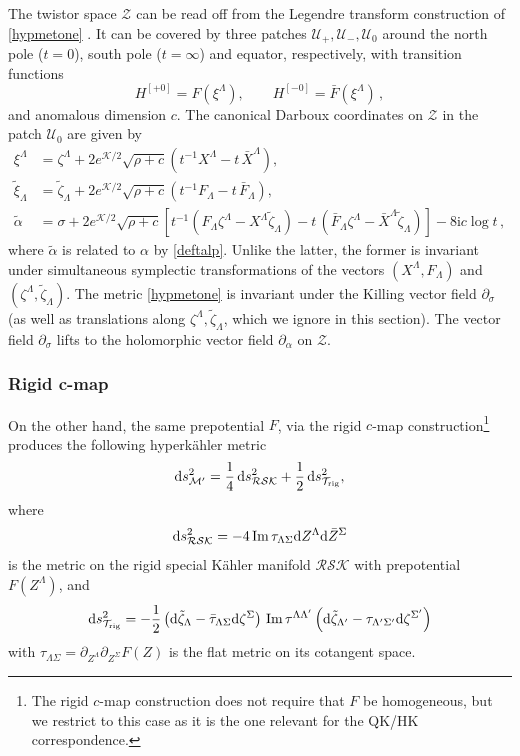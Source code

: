 \documentclass[12pt,reqno]{article}
\numberwithin{equation}{section}
\renewcommand{\Im}{\imag}
\DeclareMathOperator{\imag}{Im}
\newcommand{\be}{\begin{equation}}
\newcommand{\ee}{\end{equation}}
\def\Im{\,{\rm Im}\, }
\def\bX{\bar X}
\def\bZ{\bar Z}
\def\bF{\bar F}
\newcommand{\de}{\mathrm{d}}
\newcommand{\I}{\mathrm{i}}
\newcommand{\cS}{\mathcal{S}}
\newcommand{\cK}{\mathcal{K}}
\newcommand{\cM}{\mathcal{M}}
\newcommand{\cR}{\mathcal{R}}
\newcommand{\cT}{\mathcal{T}}
\newcommand{\cU}{\mathcal{U}}
\newcommand{\cZ}{\mathcal{Z}}
\def\Hij#1{H^{[#1]}}
\def\talp{\tilde\alpha}
\def\pa{\partial}
\newcommand{\tzeta}{{\tilde\zeta}}
\newcommand{\txi}{\tilde\xi}
\newcommand{\kahler}{{K\"ahler}\xspace}
\newcommand{\hk}{{hyperk\"ahler}\xspace}
\def\varpiqk{t}
\def\pcM{\cM'}
\def\rigZ{Z}
\def\brigZ{\bZ}
\numberwithin{equation}{section}
\begin{document}
The twistor space $\cZ$ can be read off from the Legendre transform construction
of \eqref{hypmetone} \cite{Rocek:2005ij,Robles-Llana:2006ez}.
It can be covered by three patches $\cU_+,\cU_-,\cU_0$ around the north pole  ($\varpiqk=0$),
south pole  ($\varpiqk=\infty$) and equator, respectively,
with transition functions
\be
\label{Hcmap}
\Hij{+ 0}=F(\xi^\Lambda), \qquad \Hij{- 0}=\bF(\xi^\Lambda) \, ,
\ee
and anomalous dimension $c$.
The canonical Darboux coordinates on $\cZ$ in the patch $\cU_0$
are given by \cite{Neitzke:2007ke}
 \be
\label{gentwi}
\begin{split}
\xi^\Lambda &= \zeta^\Lambda + 2e^{\cK/2} \sqrt{\rho+c}
\left( \varpiqk^{-1} X^{\Lambda} -\varpiqk \,\bX^{\Lambda}  \right),
\\
\txi_\Lambda &= \tzeta_\Lambda +2 e^{\cK/2} \sqrt{\rho+c}
\left( \varpiqk^{-1} F_\Lambda-\varpiqk \,\bF_\Lambda \right),
\\
\talp&= \sigma + 2 e^{\cK/2}\sqrt{\rho+c}
\left[\varpiqk^{-1} (F_\Lambda \zeta^\Lambda - X^\Lambda \tzeta_\Lambda)
-\varpiqk \, (\bar F_\Lambda \zeta^\Lambda - \bar X^\Lambda \tzeta_\Lambda )\right]
- 8 \I c\log \varpiqk \, ,
\end{split}
\ee
where $\talp$ is related to $\alpha$ by \eqref{deftalp}. Unlike the latter, the former
is invariant under simultaneous symplectic transformations
of the vectors $(X^\Lambda,F_\Lambda)$ and $(\zeta^\Lambda,\tzeta_\Lambda)$.
The metric \eqref{hypmetone} is invariant under the Killing vector field $\pa_\sigma$
(as well as translations along $\zeta^\Lambda,\tzeta_\Lambda$, which we ignore in
this section). The vector field $\pa_\sigma$ lifts to the holomorphic vector field
$\pa_\alpha$ on $\cZ$.


\subsubsection{Rigid c-map}
\label{rigidcmap}

On the other hand, the same prepotential $F$,
via the rigid $c$-map construction\footnote{The rigid $c$-map construction
does not require that $F$ be homogeneous, but we restrict to this case as it is the
one relevant for the QK/HK correspondence.}
produces the following \hk metric  \cite{Cecotti:1988qn}
\be
\label{rcmap}
\de s^2_{\pcM} = \frac14\,\de s^2_{\cR\cS\cK}
+  \frac{1}{2}\,\de s^2_{\cT_{\rm rig}},
\ee
where
\be
\de s^2_{\cR\cS\cK} =-4\Im\tau_{\Lambda\Sigma} \de \rigZ^\Lambda  \de \brigZ^\Sigma
\ee
is the metric on the rigid special \kahler manifold $\cR\cS\cK$ with prepotential $F(Z^\Lambda)$,
and
\be
\de s^2_{\cT_{\rm rig}}=-\frac12 \left(\de \tilde\zeta_\Lambda
-\bar{\tau}_{\Lambda\Sigma}\de \zeta^{\Sigma}\right)\Im \tau^{\Lambda\Lambda'}
\left(\de \tilde\zeta_{\Lambda'}-\tau_{\Lambda'\Sigma'}\de \zeta^{\Sigma'}\right)
\label{rigidtorus}
\ee
with $\tau_{\Lambda\Sigma} = \partial_{\rigZ^{\Lambda}}\partial_{\rigZ^{\Sigma}}F(\rigZ)$
is the flat metric on its cotangent space.
\end{document}
